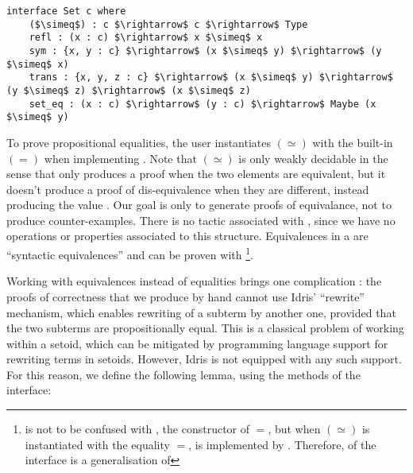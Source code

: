\begin{lstlisting}
interface Set c where
    ($\simeq$) : c $\rightarrow$ c $\rightarrow$ Type
    refl : (x : c) $\rightarrow$ x $\simeq$ x
    sym : {x, y : c} $\rightarrow$ (x $\simeq$ y) $\rightarrow$ (y $\simeq$ x)
    trans : {x, y, z : c} $\rightarrow$ (x $\simeq$ y) $\rightarrow$ (y $\simeq$ z) $\rightarrow$ (x $\simeq$ z)    
    set_eq : (x : c) $\rightarrow$ (y : c) $\rightarrow$ Maybe (x $\simeq$ y)
\end{lstlisting}

To prove propositional equalities, the user instantiates
$(\simeq)$ with the built-in $(=)$ when implementing .
Note that $(\simeq)$ is only weakly decidable in the sense
that  only produces a proof when the two elements are equivalent,
but it doesn't produce a proof of dis-equivalence when they are different,
instead producing the value . Our goal is only to generate
proofs of equivalance, not to produce counter-examples.
%
There is no tactic associated with , since we have no operations or
properties associated to this structure. Equivalences in a
 are ``syntactic equivalences'' and can be
proven with \footnote{ is not to be confused with
, the constructor of $=$, but when $(\simeq)$ is
instantiated with the equality $=$,  is implemented by
. Therefore,  of the interface  is a
generalisation of }.


Working with equivalences instead of equalities brings one complication : the proofs
of correctness that we produce by hand cannot use Idris' ``rewrite'' mechanism,
which enables rewriting of a subterm by another one, provided that the two
subterms are propositionally equal. 
%
%
This is a classical problem of
working within a setoid, which can be mitigated by programming
language support for rewriting terms in setoids. However, Idris
is not equipped with any such support. For this reason, we define the 
following lemma, using the methods of the  interface:

